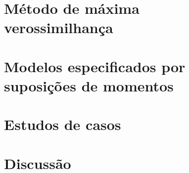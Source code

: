 \documentclass[10pt, aspectratio=169]{beamer}\usepackage[]{graphicx}\usepackage[]{color}
\begin{document}

\section{Método de máxima verossimilhança}
\label{Section3}


\section{Modelos especificados por suposições de momentos}
\label{Section4}

\section{Estudos de casos}
\label{Section5}


\section{Discussão}
\label{Section6}

\end{document}
